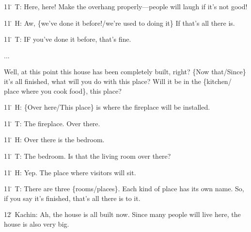11\. T: Here, here! Make the overhang properly---people will laugh if it's not
good!

11\. H: Aw, \{we've done it before!/we're used to doing it\}  If that's all there
is.

11\. T: IF you've done it before, that's fine.

...

Well, at this point this house has been completely built, right? \{Now that/Since\}
it's all finished, what will you do with this place?  Will it be in the \{kitchen/
place where you cook food\}, this place?

11\. H: \{Over here/This place\} is where the fireplace will be installed.

11\. T: The fireplace.  Over there.

11\. H: Over there is the bedroom.

11\. T: The bedroom.  Is that the living room over there?

11\. H: Yep.  The place where visitors will sit.

11\. T: There are three \{rooms/places\}.  Each kind of place has its own name.
So, if you say it's finished, that's all there is to it.

12\. Kachin: Ah, the house is all built now.  Since many people will live here,
the house is also very big.


